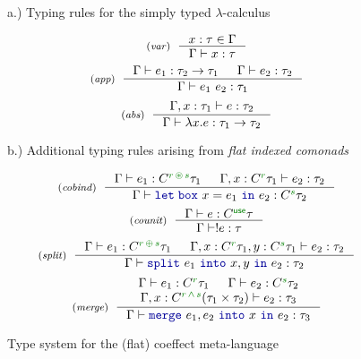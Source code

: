 \begin{figure}[t]

{\small a.) Typing rules for the simply typed $\lambda$-calculus}

\begin{equation*}
\tyrule{var}
  {x : \tau \in \Gamma}
  {\Gamma \vdash x : \tau }
\end{equation*}
\begin{equation*}
\tyrule{app}
  {\Gamma \vdash e_1 : \tau_2 \rightarrow \tau_1 &
   \Gamma \vdash e_2 : \tau_2 }
  {\Gamma \vdash e_1~e_2 : \tau_1 }
\end{equation*}
\begin{equation*}
\tyrule{abs}
  {\Gamma, x:\tau_1 \vdash e : \tau_2}
  {\Gamma \vdash \lambda x.e : \tau_1 \rightarrow \tau_2 }
\end{equation*}

\vspace{1em}
{\small b.) Additional typing rules arising from \emph{flat indexed comonads}}

\begin{equation*}
\tyrule{cobind}
  {\Gamma \vdash e_1 : \ctyp{\cclrd{r}\,\cseq\,\cclrd{s}}{\tau_1} & \Gamma, x : \ctyp{\cclrd{r}}{\tau_1} \vdash e_2 : \tau_2 }
  {\Gamma \vdash \kvd{let\;box}~x=e_1~\kvd{in}~e_2 : \ctyp{\cclrd{s}}{\tau_2}}
\end{equation*}
\begin{equation*}
\tyrule{counit}
  {\Gamma \vdash e : \ctyp{\cunit}{\tau}}
  {\Gamma \vdash !e : \tau}
\end{equation*}
\begin{equation*}
\tyrule{split}
  {\Gamma \vdash e_1 : \ctyp{\cclrd{r}\,\cpar\,\cclrd{s}}{\tau_1} &
   \Gamma, x:\ctyp{\cclrd{r}}{\tau_1}, y:\ctyp{\cclrd{s}}{\tau_1} \vdash e_2 : \tau_2 }
  {\Gamma \vdash \kvd{split}~e_1~\kvd{into}~x,y~\kvd{in}~e_2 : \tau_2 }
\end{equation*}
\begin{equation*}
\tyrule{merge}
  {\Gamma \vdash e_1 : \ctyp{\cclrd{r}}{\tau_1} &
   \Gamma \vdash e_2 : \ctyp{\cclrd{s}}{\tau_2} \\
   \Gamma, x:\ctyp{\cclrd{r}\,\czip\,\cclrd{s}}{(\tau_1 \times \tau_2)} \vdash e_2 : \tau_3 }
  {\Gamma \vdash \kvd{merge}~e_1, e_2~\kvd{into}~x~\kvd{in}~e_2 : \tau_3 }
\end{equation*}

\caption{Type system for the (flat) coeffect meta-language}
\label{fig:conclusions-cml}
\end{figure}

